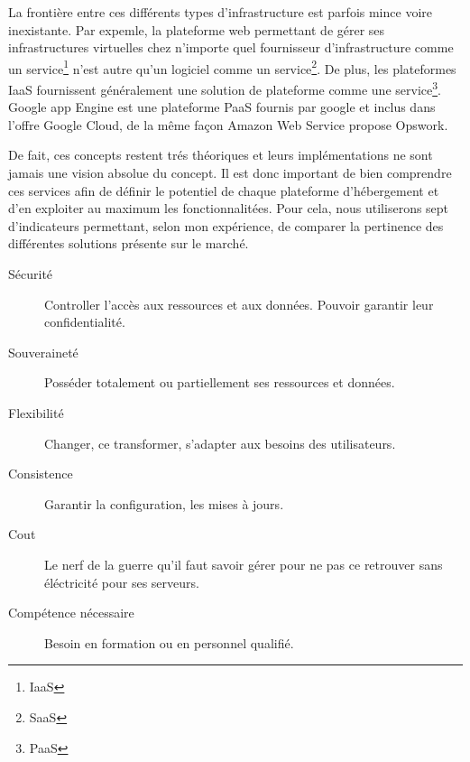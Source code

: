 \documentclass[11pt, a4paper ]{article}
\begin{document}
La frontière entre ces différents types d'infrastructure est parfois mince voire inexistante. Par expemle, la plateforme web permettant de gérer ses infrastructures virtuelles chez n'importe quel fournisseur d'infrastructure comme un service\footnote{IaaS} n'est autre qu'un logiciel comme un service\footnote{SaaS}. De plus, les plateformes IaaS fournissent généralement une solution de plateforme comme une service\footnote{PaaS}. Google app Engine est une plateforme PaaS fournis par google et inclus dans l'offre Google Cloud, de la même façon Amazon Web Service propose Opswork.

De fait, ces concepts restent trés théoriques et leurs implémentations ne sont jamais une vision absolue du concept. Il est donc important de bien comprendre ces services afin de définir le potentiel de chaque plateforme d'hébergement et d'en exploiter au maximum les fonctionnalitées.
Pour cela, nous utiliserons sept d'indicateurs permettant, selon mon expérience, de comparer la pertinence des différentes solutions présente sur le marché.

\begin{description}

	\item[Sécurité]
		Controller l'accès aux ressources et aux données. Pouvoir garantir leur confidentialité.

	\item[Souveraineté]
		Posséder totalement ou partiellement ses ressources et données.

	\item[Flexibilité]
		Changer, ce transformer, s'adapter aux besoins des utilisateurs.

	\item[Consistence]
		Garantir la configuration, les mises à jours.

	\item[Cout]
		Le nerf de la guerre qu'il faut savoir gérer pour ne pas ce retrouver sans éléctricité pour ses serveurs.

	\item[Compétence nécessaire]
		Besoin en formation ou en personnel qualifié.

\end{description}
\end{document}
